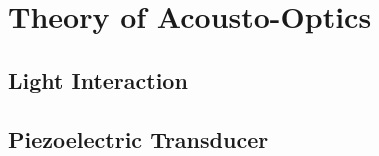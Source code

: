 \chapter{Theory of Acousto-Optics}

\section{Light Interaction}

\section{Piezoelectric Transducer}
